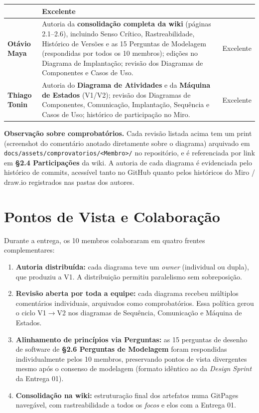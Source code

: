 \documentclass[11pt,a4paper]{article}
\begin{document}
\begin{longtable}{|p{3.8cm}|p{9.3cm}|p{1.8cm}|}
& Excelente \\ \hline
\textbf{Otávio Maya} &
Autoria da \textbf{consolidação completa da wiki} (páginas 2.1--2.6), incluindo Senso Crítico, Rastreabilidade, Histórico de Versões e as 15 Perguntas de Modelagem (respondidas por todos os 10 membros); edições no Diagrama de Implantação; revisão dos Diagramas de Componentes e Casos de Uso.
& Excelente \\ \hline
\textbf{Thiago Tonin} &
Autoria do \textbf{Diagrama de Atividades} e da \textbf{Máquina de Estados} (V1/V2); revisão dos Diagramas de Componentes, Comunicação, Implantação, Sequência e Casos de Uso; histórico de participação no Miro.
& Excelente \\ \hline
\end{longtable}

\vspace{0.4cm}

\textbf{Observação sobre comprobatórios.}
Cada revisão listada acima tem um print (screenshot do comentário anotado diretamente sobre o diagrama) arquivado em \texttt{docs/assets/comprovatorios/<Membro>/} no repositório, e é referenciada por link em \textbf{§2.4 Participações} da wiki. A autoria de cada diagrama é evidenciada pelo histórico de commits, acessível tanto no GitHub quanto pelos históricos do Miro / draw.io registrados nas pastas dos autores.

\section{Pontos de Vista e Colaboração}

Durante a entrega, os 10 membros colaboraram em quatro frentes complementares:

\begin{enumerate}[leftmargin=1.5em]
  \item \textbf{Autoria distribuída:} cada diagrama teve um \emph{owner} (individual ou dupla), que produziu a V1. A distribuição permitiu paralelismo sem sobreposição.
  \item \textbf{Revisão aberta por toda a equipe:} cada diagrama recebeu múltiplos comentários individuais, arquivados como comprobatórios. Essa política gerou o ciclo V1$\to$V2 nos diagramas de Sequência, Comunicação e Máquina de Estados.
  \item \textbf{Alinhamento de princípios via Perguntas:} as 15 perguntas de desenho de software de \textbf{§2.6 Perguntas de Modelagem} foram respondidas individualmente pelos 10 membros, preservando pontos de vista divergentes mesmo após o consenso de modelagem (formato idêntico ao da \emph{Design Sprint} da Entrega 01).
  \item \textbf{Consolidação na wiki:} estruturação final dos artefatos numa GitPages navegável, com rastreabilidade a todos os \emph{focos} e elos com a Entrega 01.
\end{enumerate}
\end{document}
